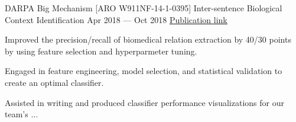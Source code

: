 \begin{cventries}
  \cventry
    {DARPA Big Mechanism [ARO W911NF-14-1-0395]} %
    {Inter-sentence Biological Context Identification} %
    {Apr 2018 --- Oct 2018} %
    {\href{https://ieeexplore.ieee.org/document/8664185}{\underline{Publication link}}} %
    {
      \vspace{-0.15cm}
      \begin{cvitems} %
        \item Improved the precision/recall of biomedical relation extraction by 40/30 points by using feature selection and hyperparmeter tuning.
        \item Engaged in feature engineering, model selection, and statistical validation to create an optimal classifier.
        \item Assisted in writing and produced classifier performance visualizations for our team's ...
      \end{cvitems}
    }



\end{cventries}
